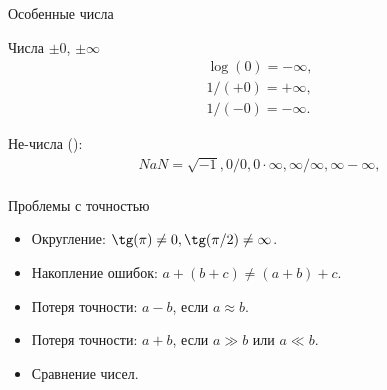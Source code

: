 \begin{frame}{Особенные числа}

  \begin{block}{Числа $\pm 0$, $\pm \infty$}
    \reduceBlockEqSpacing
    \begin{gather*}
      \log(0) = -\infty, \\
      1 / (+0) = +\infty, \\
      1 / (-0) = -\infty.
    \end{gather*}
  \end{block}

  \pause

  \newcommand{\NaN}{NaN}

  \begin{block}{Не-числа ():}
    \reduceBlockEqSpacing
    \begin{gather*}
      \NaN = \sqrt{-1}, 0 / 0, 0 \cdot \infty, \infty / \infty, \infty - \infty, \\
    \end{gather*}
  \end{block}

  \let\NaN\undefined


\end{frame}

\begin{frame}{Проблемы с точностью}

  \begin{itemize}[<+->]
    \item Округление: $\tg(\pi) \neq 0, \tg(\pi/2) \neq \infty$.
    \item Накопление ошибок:
      $a + (b + c) \neq (a + b) + c$.
    \item Потеря точности:
      $a - b$, если $a \approx b$.
    \item Потеря точности:
      $a + b$, если $a \gg b$ или $a \ll b$.
    \item Сравнение чисел.
  \end{itemize}

\end{frame}


